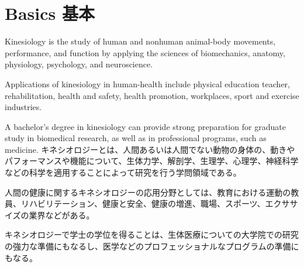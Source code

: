 \documentclass[uplatex,dvipdfmx]{jsarticle} \usepackage{amsmath,amssymb,bm}
\begin{document}
\section*{Basics 基本}
\begin{paracol}{2}
Kinesiology is the study of human and nonhuman animal-body movements, performance, and function by applying the sciences of biomechanics, anatomy, physiology, psychology, and neuroscience.

Applications of kinesiology in human-health include physical education teacher, rehabilitation, health and safety, health promotion, workplaces, sport and exercise industries.

A bachelor's degree in kinesiology can provide strong preparation for graduate study in biomedical research, as well as in professional programs, such as medicine.
\switchcolumn
キネシオロジーとは、人間あるいは人間でない動物の身体の、動きやパフォーマンスや機能について、生体力学、解剖学、生理学、心理学、神経科学などの科学を適用することによって研究を行う学問領域である。

人間の健康に関するキネシオロジーの応用分野としては、教育における運動の教員、リハビリテーション、健康と安全、健康の増進、職場、スポーツ、エクササイズの業界などがある。

キネシオロジーで学士の学位を得ることは、生体医療についての大学院での研究の強力な準備にもなるし、医学などのプロフェッショナルなプログラムの準備にもなる。
\end{paracol}
\vspace{\baselineskip}
\end{document}
